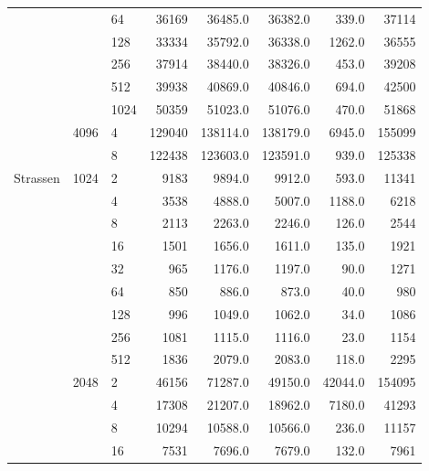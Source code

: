 \begin{tabular}{lllrrrrr}
           &      & 64 &                36169 &   36485.0 &   36382.0 &    339.0 &   37114 \\
           &      & 128 &                33334 &   35792.0 &   36338.0 &   1262.0 &   36555 \\
           &      & 256 &                37914 &   38440.0 &   38326.0 &    453.0 &   39208 \\
           &      & 512 &                39938 &   40869.0 &   40846.0 &    694.0 &   42500 \\
           &      & 1024 &                50359 &   51023.0 &   51076.0 &    470.0 &   51868 \\
           & 4096 & 4 &               129040 &  138114.0 &  138179.0 &   6945.0 &  155099 \\
           &      & 8 &               122438 &  123603.0 &  123591.0 &    939.0 &  125338 \\
Strassen & 1024 & 2 &                 9183 &    9894.0 &    9912.0 &    593.0 &   11341 \\
           &      & 4 &                 3538 &    4888.0 &    5007.0 &   1188.0 &    6218 \\
           &      & 8 &                 2113 &    2263.0 &    2246.0 &    126.0 &    2544 \\
           &      & 16 &                 1501 &    1656.0 &    1611.0 &    135.0 &    1921 \\
           &      & 32 &                  965 &    1176.0 &    1197.0 &     90.0 &    1271 \\
           &      & 64 &                  850 &     886.0 &     873.0 &     40.0 &     980 \\
           &      & 128 &                  996 &    1049.0 &    1062.0 &     34.0 &    1086 \\
           &      & 256 &                 1081 &    1115.0 &    1116.0 &     23.0 &    1154 \\
           &      & 512 &                 1836 &    2079.0 &    2083.0 &    118.0 &    2295 \\
           & 2048 & 2 &                46156 &   71287.0 &   49150.0 &  42044.0 &  154095 \\
           &      & 4 &                17308 &   21207.0 &   18962.0 &   7180.0 &   41293 \\
           &      & 8 &                10294 &   10588.0 &   10566.0 &    236.0 &   11157 \\
           &      & 16 &                 7531 &    7696.0 &    7679.0 &    132.0 &    7961 \\

\end{tabular}
